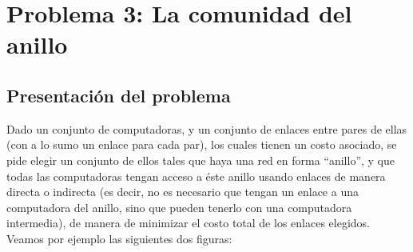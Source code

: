 \section{Problema 3: La comunidad del anillo}

\subsection{Presentación del problema}

Dado un conjunto de computadoras, y un conjunto de enlaces entre pares de ellas (con a lo sumo un enlace para cada par), los cuales tienen un costo asociado, se pide elegir un conjunto de ellos tales que haya una red en forma ``anillo'', y que todas las computadoras tengan acceso a éste anillo usando enlaces de manera directa o indirecta (es decir, no es necesario que tengan un enlace a una computadora del anillo, sino que pueden tenerlo con una computadora intermedia), de manera de minimizar el costo total de los enlaces elegidos. Veamos por ejemplo las siguientes dos figuras:

